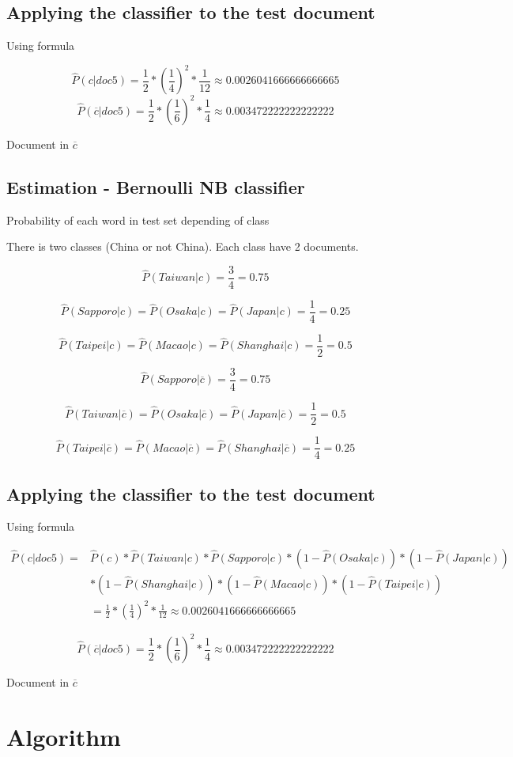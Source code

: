 \documentclass{article}
\begin{document}
\subsection{Applying the classifier to the test document}

Using formula

\[\hat{P}(c|doc5) = \frac{1}{2} * (\frac{1}{4})^2 * \frac{1}{12} \approx 0.0026041666666666665\]
\[\hat{P}(\overline{c}|doc5)  = \frac{1}{2} * (\frac{1}{6})^2 * \frac{1}{4} \approx 0.003472222222222222\]

Document in $\overline{c}$

\subsection{Estimation - Bernoulli NB classifier}
Probability of each word in test set depending of class

There is two classes (China or not China). Each class have 2 documents.

\[\hat{P}(Taiwan|c) = \frac{3}{4} = 0.75\]

\[\hat{P}(Sapporo|c) = \hat{P}(Osaka|c) = \hat{P}(Japan|c) = \frac{1}{4} = 0.25\]

\[\hat{P}(Taipei|c) = \hat{P}(Macao|c) = \hat{P}(Shanghai|c) = \frac{1}{2} = 0.5\]

\[\hat{P}(Sapporo|\overline{c}) = \frac{3}{4} = 0.75\]

\[\hat{P}(Taiwan|\overline{c}) = \hat{P}(Osaka|\overline{c}) = \hat{P}(Japan|\overline{c}) = \frac{1}{2} = 0.5\]

\[\hat{P}(Taipei|\overline{c}) = \hat{P}(Macao|\overline{c}) = \hat{P}(Shanghai|\overline{c}) = \frac{1}{4} = 0.25\]




\subsection{Applying the classifier to the test document}

Using formula


\begin{equation}
    \begin{aligned}
\hat{P}(c|doc5) = {} & \hat{P}(c) * \hat{P}(Taiwan|c) *  \hat{P}(Sapporo|c) * (1 - \hat{P}(Osaka|c) ) * (1-\hat{P}(Japan|c) ) \\
& * (1 - \hat{P}(Shanghai|c) ) * (1-\hat{P}(Macao|c) ) * (1 - \hat{P}(Taipei|c) ) \\ & = \frac{1}{2} * (\frac{1}{4})^2 * \frac{1}{12} \approx 0.0026041666666666665
 \end{aligned}
\end{equation}

 
\[\hat{P}(\overline{c}|doc5)  = \frac{1}{2} * (\frac{1}{6})^2 * \frac{1}{4} \approx 0.003472222222222222\]

Document in $\overline{c}$

\section{Algorithm}
\end{document}
